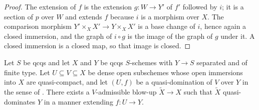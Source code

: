 \begin{proof}
  \leanok
  The extension of $f$ is the extension $g\colon W\to Y'$ of $f'$ followed by
  $i$; it is a section of $p$ over $W$ and extends $f$ because $i$ is a
  morphism over $X$.  The comparison morphism
  $Y'\times_XX'\to Y\times_XX'$ is a base change of $i$, hence again a closed
  immersion, and the graph of $i\circ g$ is the image of the graph of $g$ under
  it.  A closed immersion is a closed map, so that image is closed.
\end{proof}

\begin{theorem}
  \label{thm:nagata-conrad-elimination}
  \leanok

  Let $S$ be qcqs and let $X$ and $Y$ be qcqs $S$-schemes with $Y\to S$
  separated and of finite type.  Let $U\subseteq V\subseteq X$ be dense open
  subschemes whose open immersions into $X$ are quasi-compact, and let $(U,f)$
  be a quasi-domination of $V$ over $Y$ in the sense of
  .  There exists a $V$-admissible
  blow-up $\widetilde X\to X$ such that $\widetilde X$ quasi-dominates $Y$ in a
  manner extending $f\colon U\to Y$.
\end{theorem}

